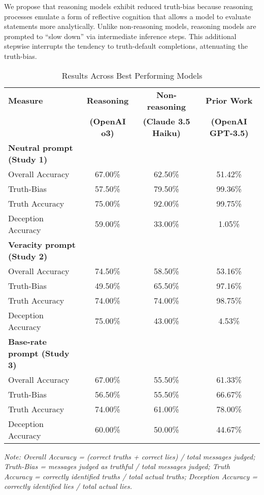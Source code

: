 \documentclass{article}
\begin{document}
We propose that reasoning models exhibit reduced truth-bias because reasoning processes emulate a form of reflective cognition that allows a model to evaluate statements more analytically. Unlike non-reasoning models, reasoning models are prompted to ``slow down'' via intermediate inference steps. This additional stepwise interrupts the tendency to truth-default completions, attenuating the truth-bias.

\begin{table}[ht]
\centering
\caption{Results Across Best Performing Models}
\begin{tabular}{lccc}
\toprule
\textbf{Measure} & \textbf{Reasoning} & \textbf{Non-reasoning} & \textbf{Prior Work} \citep{markowitz_generative_2024} \\
 & \textbf{(OpenAI o3)} & \textbf{(Claude 3.5 Haiku)} & \textbf{(OpenAI GPT-3.5)} \\
\midrule
\textbf{Neutral prompt (Study 1)} & & & \\
Overall Accuracy & 67.00\% & 62.50\% & 51.42\% \\
Truth-Bias & 57.50\% & 79.50\% & 99.36\% \\
Truth Accuracy & 75.00\% & 92.00\% & 99.75\% \\
Deception Accuracy & 59.00\% & 33.00\% & 1.05\% \\
\midrule
\textbf{Veracity prompt (Study 2)} & & & \\
Overall Accuracy & 74.50\% & 58.50\% & 53.16\% \\
Truth-Bias & 49.50\% & 65.50\% & 97.16\% \\
Truth Accuracy & 74.00\% & 74.00\% & 98.75\% \\
Deception Accuracy & 75.00\% & 43.00\% & 4.53\% \\
\midrule
\textbf{Base-rate prompt (Study 3)} & & & \\
Overall Accuracy & 67.00\% & 55.50\% & 61.33\% \\
Truth-Bias & 56.50\% & 55.50\% & 66.67\% \\
Truth Accuracy & 74.00\% & 61.00\% & 78.00\% \\
Deception Accuracy & 60.00\% & 50.00\% & 44.67\% \\
\bottomrule
\end{tabular}
\begin{minipage}{0.9\linewidth}
\vspace{0.05in}
\footnotesize
\textit{Note: Overall Accuracy = (correct truths + correct lies) / total messages judged; Truth-Bias = messages judged as truthful / total messages judged; Truth Accuracy = correctly identified truths / total actual truths; Deception Accuracy = correctly identified lies / total actual lies.}
\end{minipage}
\label{tab:results_across_models}
\end{table}
\end{document}
